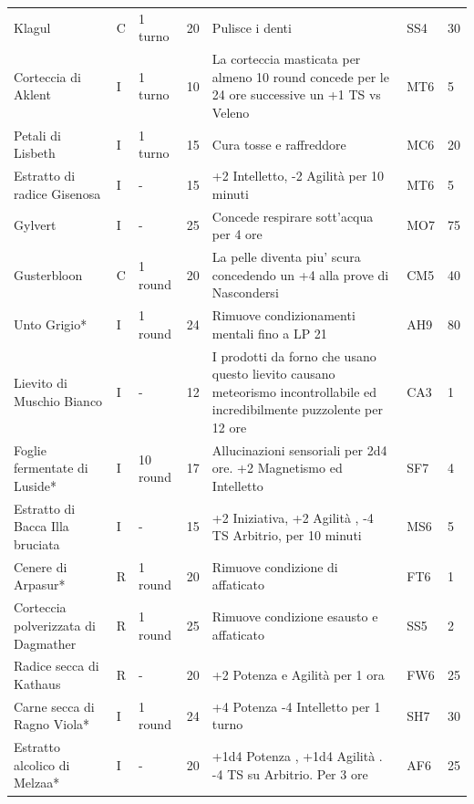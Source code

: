 \documentclass[a4paper,11pt,twoside,openany]{book}
\begin{document}
\begin{longtable}{|L{3.2cm} |k{0.7cm} |k{1.7cm}| D{1cm} |L{5cm} |k{1.5cm} |k{1cm}|}
	Klagul& C  & 1 turno   & 20& Pulisce i denti & SS4 & 30   \\
	Corteccia di Aklent    & I  & 1 turno   & 10& La corteccia masticata per almeno 10 round concede per le 24 ore successive un +1 TS vs Veleno  & MT6 & 5    \\
	Petali di Lisbeth   & I  & 1 turno   & 15& Cura tosse e raffreddore  & MC6 & 20   \\
	Estratto di radice Gisenosa   & I  & -    & 15& +2 Intelletto, -2 Agilità per 10 minuti  & MT6 & 5    \\
	Gylvert   & I  & -    & 25& Concede respirare sott'acqua per 4 ore   & MO7 & 75   \\
	Gusterbloon     & C  & 1 round   & 20& La pelle diventa piu' scura concedendo un +4 alla prove di Nascondersi & CM5 & 40   \\
	Unto Grigio{*}  & I  & 1 round   & 24& Rimuove condizionamenti mentali fino a LP 21  & AH9 & 80   \\
	Lievito di Muschio Bianco  & I  & -    & 12& I prodotti da forno che usano questo lievito causano meteorismo incontrollabile ed incredibilmente puzzolente per 12 ore & CA3 & 1    \\
	Foglie fermentate di Luside*  & I  & 10 round  & 17& Allucinazioni sensoriali per 2d4 ore. +2 Magnetismo ed Intelletto & SF7 & 4    \\
	Estratto di Bacca Illa bruciata& I  & -    & 15& +2 Iniziativa, +2 Agilità , -4 TS Arbitrio, per 10 minuti    & MS6 & 5    \\
	Cenere di Arpasur{*}     & R  & 1 round   & 20& Rimuove condizione di affaticato    & FT6 & 1    \\
	Corteccia polverizzata di Dagmather    & R  & 1 round   & 25& Rimuove condizione esausto e affaticato  & SS5 & 2    \\
	Radice secca di Kathaus & R  & -    & 20& +2 Potenza e Agilità per 1 ora & FW6 & 25   \\
	Carne secca di Ragno Viola*    & I  & 1 round   & 24& +4 Potenza -4 Intelletto per 1 turno& SH7 & 30   \\
	Estratto alcolico di Melzaa*  & I  & -    & 20& +1d4 Potenza , +1d4 Agilità . -4 TS su Arbitrio. Per 3 ore   & AF6 & 25   \\

\end{longtable}
\end{document}
